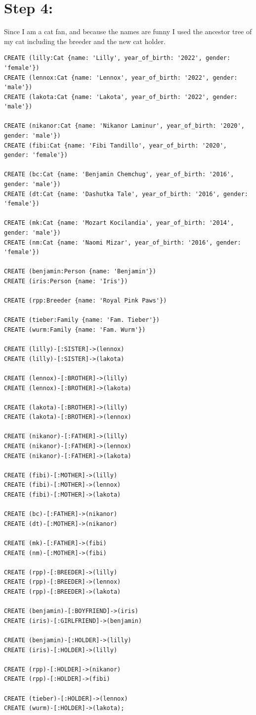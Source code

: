 \documentclass[14pt,a4paper]{extarticle}
\begin{document}
	\newpage
	
	\section*{Step 4:}
	Since I am a cat fan, and because the names are funny I used the ancestor tree of my cat including the breeder and the new cat holder.

	\begin{lstlisting}[style=sql]
CREATE (lilly:Cat {name: 'Lilly', year_of_birth: '2022', gender: 'female'})
CREATE (lennox:Cat {name: 'Lennox', year_of_birth: '2022', gender: 'male'})
CREATE (lakota:Cat {name: 'Lakota', year_of_birth: '2022', gender: 'male'})

CREATE (nikanor:Cat {name: 'Nikanor Laminur', year_of_birth: '2020', gender: 'male'})
CREATE (fibi:Cat {name: 'Fibi Tandillo', year_of_birth: '2020', gender: 'female'})

CREATE (bc:Cat {name: 'Benjamin Chemchug', year_of_birth: '2016', gender: 'male'})
CREATE (dt:Cat {name: 'Dashutka Tale', year_of_birth: '2016', gender: 'female'})

CREATE (mk:Cat {name: 'Mozart Kocilandia', year_of_birth: '2014', gender: 'male'})
CREATE (nm:Cat {name: 'Naomi Mizar', year_of_birth: '2016', gender: 'female'})

CREATE (benjamin:Person {name: 'Benjamin'})
CREATE (iris:Person {name: 'Iris'})

CREATE (rpp:Breeder {name: 'Royal Pink Paws'})

CREATE (tieber:Family {name: 'Fam. Tieber'})
CREATE (wurm:Family {name: 'Fam. Wurm'})

CREATE (lilly)-[:SISTER]->(lennox)
CREATE (lilly)-[:SISTER]->(lakota)

CREATE (lennox)-[:BROTHER]->(lilly)
CREATE (lennox)-[:BROTHER]->(lakota)

CREATE (lakota)-[:BROTHER]->(lilly)
CREATE (lakota)-[:BROTHER]->(lennox)

CREATE (nikanor)-[:FATHER]->(lilly)
CREATE (nikanor)-[:FATHER]->(lennox)
CREATE (nikanor)-[:FATHER]->(lakota)

CREATE (fibi)-[:MOTHER]->(lilly)
CREATE (fibi)-[:MOTHER]->(lennox)
CREATE (fibi)-[:MOTHER]->(lakota)

CREATE (bc)-[:FATHER]->(nikanor)
CREATE (dt)-[:MOTHER]->(nikanor)

CREATE (mk)-[:FATHER]->(fibi)
CREATE (nm)-[:MOTHER]->(fibi)

CREATE (rpp)-[:BREEDER]->(lilly)
CREATE (rpp)-[:BREEDER]->(lennox)
CREATE (rpp)-[:BREEDER]->(lakota)

CREATE (benjamin)-[:BOYFRIEND]->(iris)
CREATE (iris)-[:GIRLFRIEND]->(benjamin)

CREATE (benjamin)-[:HOLDER]->(lilly)
CREATE (iris)-[:HOLDER]->(lilly)

CREATE (rpp)-[:HOLDER]->(nikanor)
CREATE (rpp)-[:HOLDER]->(fibi)

CREATE (tieber)-[:HOLDER]->(lennox)
CREATE (wurm)-[:HOLDER]->(lakota);
	\end{lstlisting}
\end{document}
